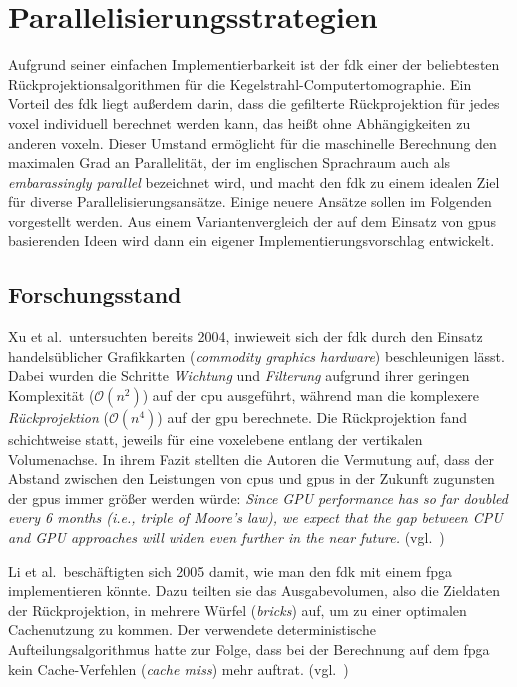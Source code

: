 \chapter{Parallelisierungsstrategien}

Aufgrund seiner einfachen Implementierbarkeit ist der \gls{fdk} einer der beliebtesten Rückprojektionsalgorithmen für
die Kegelstrahl-Computertomographie. Ein Vorteil des \gls{fdk} liegt außerdem darin, dass die gefilterte Rückprojektion
für jedes \gls{voxel} individuell berechnet werden kann, das heißt ohne Abhängigkeiten zu anderen \gls{voxel}n. Dieser
Umstand ermöglicht für die maschinelle Berechnung den maximalen Grad an Parallelität, der im englischen Sprachraum auch
als \textit{embarassingly parallel} bezeichnet wird, und macht den \gls{fdk} zu einem idealen Ziel für diverse
Parallelisierungsansätze. Einige neuere Ansätze sollen im Folgenden vorgestellt werden. Aus einem Variantenvergleich
der auf dem Einsatz von \gls{gpu}s basierenden Ideen wird dann ein eigener Implementierungsvorschlag entwickelt.

\section{Forschungsstand}\label{sec:forschungsstand}

Xu et al.\ untersuchten bereits 2004, inwieweit sich der \gls{fdk} durch den Einsatz handelsüblicher Grafikkarten
(\textit{commodity graphics hardware}) beschleunigen lässt. Dabei wurden die Schritte \textit{Wichtung} und
\textit{Filterung} aufgrund ihrer geringen Komplexität ($\mathcal{O}(n^2)$) auf der \gls{cpu} ausgeführt, während man
die komplexere \textit{Rückprojektion} ($\mathcal{O}(n^4)$) auf der \gls{gpu} berechnete. Die Rückprojektion fand
schichtweise statt, jeweils für eine \gls{voxel}ebene entlang der vertikalen Volumenachse. In ihrem Fazit stellten die
Autoren die Vermutung auf, dass der Abstand zwischen den Leistungen von \gls{cpu}s und \gls{gpu}s in der Zukunft
zugunsten der \gls{gpu}s immer größer werden würde: \textit{Since GPU performance has so far doubled every 6 months 
(i.e., triple of Moore's law), we expect that the gap between CPU and GPU approaches will widen even further in the near
future.} (vgl.~\cite{xumuell})

Li et al.\ beschäftigten sich 2005 damit, wie man den \gls{fdk} mit einem \gls{fpga} implementieren könnte. Dazu teilten
sie das Ausgabevolumen, also die Zieldaten der Rückprojektion, in mehrere Würfel (\textit{bricks}) auf, um zu einer
optimalen Cachenutzung zu kommen. Der verwendete deterministische Aufteilungsalgorithmus hatte zur Folge, dass bei der
Berechnung auf dem \gls{fpga} kein Cache-Verfehlen (\textit{cache miss}) mehr auftrat. (vgl.~\cite{lipapa})

